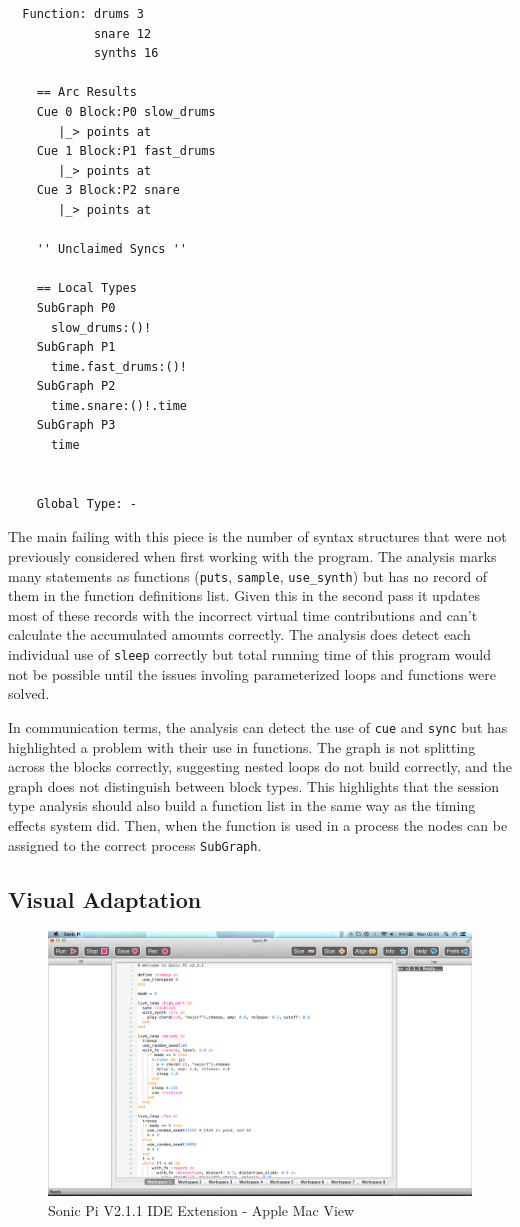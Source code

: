 \documentclass[11pt, abstracton, twoside, titlepage=true]{scrartcl}
\begin{document}
\begin{lstlisting}
  Function: drums 3
            snare 12
            synths 16

    == Arc Results       
    Cue 0 Block:P0 slow_drums
       |_> points at 
    Cue 1 Block:P1 fast_drums
       |_> points at 
    Cue 3 Block:P2 snare
       |_> points at 

    '' Unclaimed Syncs ''   

    == Local Types
    SubGraph P0
      slow_drums:()!
    SubGraph P1
      time.fast_drums:()!
    SubGraph P2
      time.snare:()!.time
    SubGraph P3
      time


    Global Type: -  
\end{lstlisting}

The main failing with this piece is the number of syntax structures that were not 
previously considered when first working with the program. The analysis marks many
statements as functions (\texttt{puts}, \texttt{sample}, \texttt{use\_synth}) but 
has no record of them in the function definitions list. Given this in the second pass 
it updates most of these records with the incorrect virtual time contributions and 
can't calculate the accumulated amounts correctly. The analysis does detect each 
individual use of \texttt{sleep} correctly but total running time of this program 
would not be possible until the issues involing parameterized loops and functions 
were solved.

In communication terms, the analysis can detect the use of \texttt{cue} and 
\texttt{sync} but has highlighted a problem with their use in functions. The graph is 
not splitting across the blocks correctly, suggesting nested loops do not build 
correctly, and the graph does not distinguish between block types. This highlights 
that the session type analysis should also build a function list in the same way 
as the timing effects system did. Then, when the function is used in a process the 
nodes can be assigned to the correct process \texttt{SubGraph}.

\subsection{Visual Adaptation}
\begin{figure}[ht]
	\centering
	\includegraphics[width=\textwidth]{images/sonic-ide-v2.png}
	\caption{Sonic Pi V2.1.1 IDE Extension - Apple Mac View} \label{macview}
\end{figure}
\end{document}

